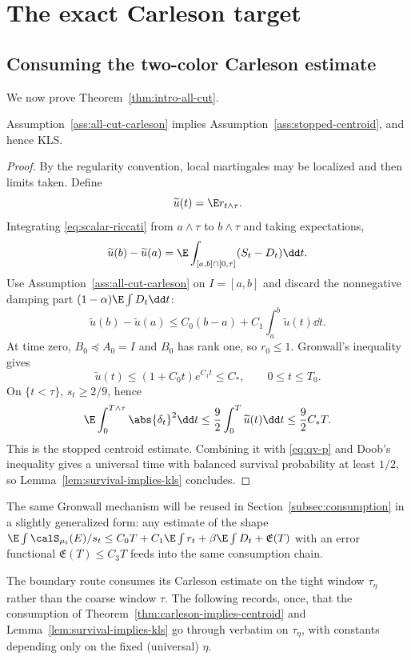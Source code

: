 \documentclass[../../main.tex]{subfiles}
\begin{document}
\section{The exact Carleson target}
\label{sec:carleson}

\subsection{Consuming the two-color Carleson estimate}

We now prove Theorem~\ref{thm:intro-all-cut}.

\begin{theorem}
\label{thm:carleson-implies-centroid}
Assumption~\ref{ass:all-cut-carleson} implies Assumption~\ref{ass:stopped-centroid}, and hence KLS.
\end{theorem}

\begin{proof}
By the regularity convention, local martingales may be localized and then limits taken. Define
\[
  \widetilde u(t)=\E r_{t\wedge\tau}.
\]
Integrating \eqref{eq:scalar-riccati} from $a\wedge\tau$ to $b\wedge\tau$ and taking expectations,
\[
  \widetilde u(b)-\widetilde u(a)
  =\E\int_{[a,b]\cap[0,\tau]}(S_t-D_t)\dd t .
\]
Use Assumption~\ref{ass:all-cut-carleson} on $I=[a,b]$ and discard the nonnegative damping part
$(1-\alpha)\E\int D_t\dd t$:
\[
  \widetilde u(b)-\widetilde u(a)
  \le C_0(b-a)+C_1\int_a^b\widetilde u(t)\dd t .
\]
At time zero, $B_0\preceq A_0=I$ and $B_0$ has rank one, so $r_0\le1$. Gronwall's inequality gives
\[
  \widetilde u(t)\le (1+C_0t)e^{C_1t}\le C_*,
  \qquad 0\le t\le T_0 .
\]
On $\{t<\tau\}$, $s_t\ge2/9$, hence
\[
  \E\int_0^{T\wedge\tau}\abs{\delta_t}^2\dd t
  \le\frac92\int_0^T\widetilde u(t)\dd t
  \le\frac92C_*T .
\]
This is the stopped centroid estimate. Combining it with \eqref{eq:qv-p} and Doob's inequality
gives a universal time with balanced survival probability at least $1/2$, so
Lemma~\ref{lem:survival-implies-kls} concludes.
\end{proof}

The same Gronwall mechanism will be reused in Section~\ref{subsec:consumption} in a slightly
generalized form: any estimate of the shape
$\E\int\calS_{\mu_t}(E)/s_t\le C_0T+C_1\E\int r_t+\beta\E\int D_t+\mathfrak E(T)$ with an error
functional $\mathfrak E(T)\le C_3T$ feeds into the same consumption chain.

The boundary route consumes its Carleson estimate on the tight window $\tau_\eta$ rather than the
coarse window $\tau$. The following records, once, that the consumption of
Theorem~\ref{thm:carleson-implies-centroid} and
Lemma~\ref{lem:survival-implies-kls} go through verbatim on $\tau_\eta$, with constants
depending only on the fixed (universal) $\eta$.
\end{document}
